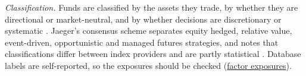 \begin{qfmethod}\label{meth:hedge-fund-strategy-classification}
 \emph{Classification.} Funds are classified by the assets they trade, by whether they are directional or market-neutral, and by whether decisions are discretionary or systematic \citep[pp.~571--572]{s7-ang}. Jaeger's consensus scheme separates equity hedged, relative value, event-driven, opportunistic and managed futures strategies, and notes that classifications differ between index providers and are partly statistical \citep[pp.~11--14]{jaeger-alternative-beta-2008}. Database labels are self-reported, so the exposures should be checked (\hyperref[meth:hedge-fund-factor-exposures]{factor exposures}).


\end{qfmethod}
